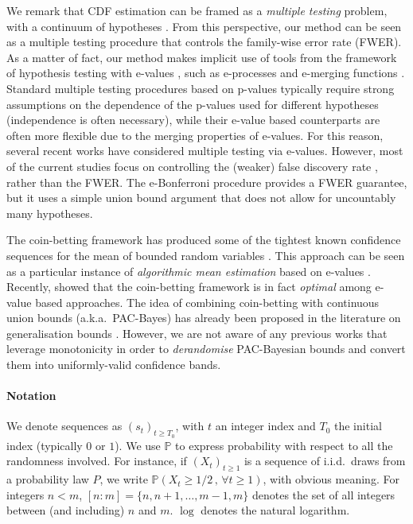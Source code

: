 \documentclass[3p, authoryear, 10pt]{elsarticle}%
\begin{document}
We remark that CDF estimation can be framed as a \emph{multiple testing} problem, with a continuum of hypotheses \citep{goldman2018comparing}. From this perspective, our method can be seen as a multiple testing procedure that controls the family-wise error rate (FWER). As a matter of fact, our method makes implicit use of tools from the framework of hypothesis testing with e-values \citep{wasserman2020universal, shafer2021testing, vovk2021evalues, grunwald2024safe, ramdas2024hypothesis}, such as e-processes \citep{ramdas2022admissible} and e-merging functions \citep{vovk2021evalues}. Standard multiple testing procedures based on p-values typically require strong assumptions on the dependence of the p-values used for different hypotheses (independence is often necessary), while their e-value based counterparts are often more flexible due to the merging properties of e-values. For this reason, several recent works have considered multiple testing via e-values. However, most of the current studies focus on controlling the (weaker) false discovery rate \citep{wang2022false, xu2023online, xu2024powerful}, rather than the FWER. The e-Bonferroni procedure \citep{hartog2025family} provides a FWER guarantee, but it uses a simple union bound argument that does not allow for uncountably many hypotheses.

The coin-betting framework has produced some of the tightest known confidence sequences for the mean of bounded random variables \citep{orabona2023tight, waudbysmith23estimating}. This approach can be seen as a particular instance of \emph{algorithmic mean estimation} based on e-values \citep{ramdas2023game}. Recently, \cite{clerico2024optimality} showed that the coin-betting framework is in fact \emph{optimal} among e-value based approaches. The idea of combining coin-betting with continuous union bounds (a.k.a.~PAC-Bayes) has already been proposed in the literature on generalisation bounds \citep{jang2023tighter}. However, we are not aware of any previous works that leverage monotonicity in order to \emph{derandomise} PAC-Bayesian bounds and convert them into uniformly-valid confidence bands.
\paragraph{Notation} We denote sequences as $(s_t)_{t\geq T_0}$, with $t$ an integer index and $T_0$ the initial index (typically $0$ or $1$). We use $\mathbb P$ to express probability with respect to all the randomness involved. For instance, if $(X_t)_{t\geq 1}$ is a sequence of i.i.d.\ draws from a probability law $P$, we  write $\mathbb P(X_t\geq1/2\,,\,\forall t\geq 1)$, with obvious meaning. For integers $n < m$, $[n :m] = \{n, n+1, \dots, m -1, m\}$ denotes the set of all integers between (and including) $n$ and $m$. $\log$ denotes the natural logarithm.
\end{document}
